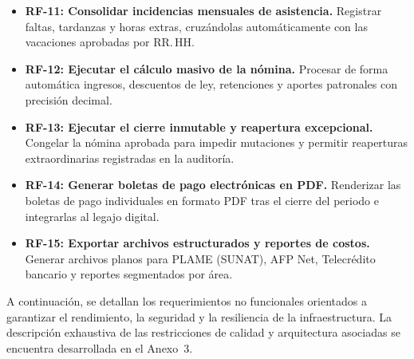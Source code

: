 \begin{itemize}
    \item \textbf{RF-11: Consolidar incidencias mensuales de asistencia.} Registrar faltas, tardanzas y horas extras, cruzándolas automáticamente con las vacaciones aprobadas por RR.\,HH.
    \item \textbf{RF-12: Ejecutar el cálculo masivo de la nómina.} Procesar de forma automática ingresos, descuentos de ley, retenciones y aportes patronales con precisión decimal.
    \item \textbf{RF-13: Ejecutar el cierre inmutable y reapertura excepcional.} Congelar la nómina aprobada para impedir mutaciones y permitir reaperturas extraordinarias registradas en la auditoría.
    \item \textbf{RF-14: Generar boletas de pago electrónicas en PDF.} Renderizar las boletas de pago individuales en formato PDF tras el cierre del periodo e integrarlas al legajo digital.
    \item \textbf{RF-15: Exportar archivos estructurados y reportes de costos.} Generar archivos planos para PLAME (SUNAT), AFP Net, Telecrédito bancario y reportes segmentados por área.
\end{itemize}


A continuación, se detallan los requerimientos no funcionales orientados a garantizar el rendimiento, 
la seguridad y la resiliencia de la infraestructura. La descripción exhaustiva de las restricciones de calidad y arquitectura asociadas se encuentra desarrollada en el Anexo~3.


